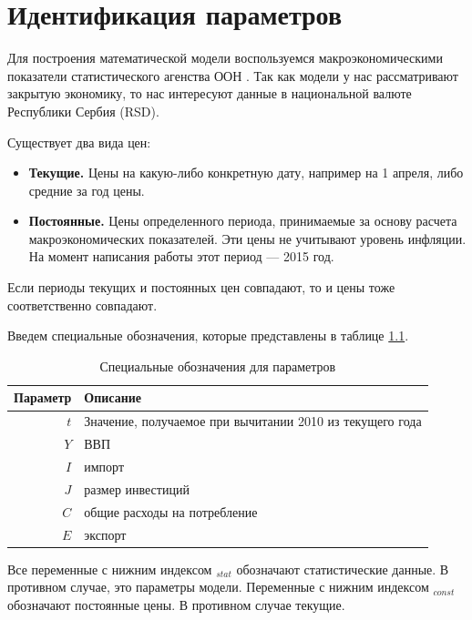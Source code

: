 \chapter{Идентификация параметров}
\label{cha:ident_params}

Для построения математической модели воспользуемся макроэкономическими показатели статистического агенства ООН \cite{unstat}.
Так как модели у нас рассматривают закрытую экономику, то нас интересуют данные в национальной валюте Республики Сербия (RSD).

Существует два вида цен:
\begin{itemize}
	\item \textbf{Текущие.}
	Цены на какую-либо конкретную дату, например на 1 апреля, либо средние за год цены.
	\item \textbf{Постоянные.}
	Цены определенного периода, принимаемые за основу расчета макроэкономических показателей.
	Эти цены не учитывают уровень инфляции.
	На момент написания работы этот период --- 2015 год.
\end{itemize}
Если периоды текущих и постоянных цен совпадают, то и цены тоже соответственно совпадают.

Введем специальные обозначения, которые представлены в таблице \ref{tab:desig_of_params}.
\begin{table}[ht]
	\caption{Специальные обозначения для параметров}
	\begin{tabular}{|r|l|}
	\hline
	\multicolumn{1}{|r|}{Параметр} & \multicolumn{1}{l|}{Описание} \\ \hline
	$t$                          &Значение, получаемое при вычитании 2010 из текущего года\\
	$Y$                          & ВВП                                                   \\
	$I$                          & импорт                                                \\
	$J$                          & размер инвестиций                                     \\
	$C$                          & общие расходы на потребление                          \\
	$E$                          & экспорт                                               \\ \hline
	\end{tabular}
	\label{tab:desig_of_params}
\end{table}
Все переменные с нижним индексом $_{stat}$ обозначают статистические данные.
В противном случае, это параметры модели.
Переменные с нижним индексом $_{const}$ обозначают постоянные цены.
В противном случае текущие.

